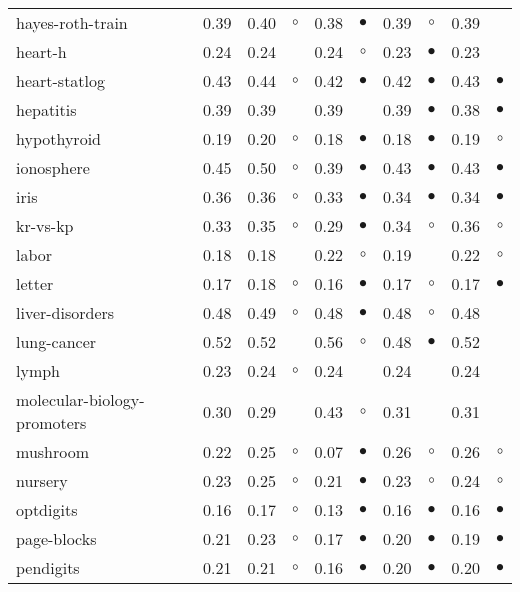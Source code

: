 \begin{table}[thb]
{\begin{tabular}{lrr@{\hspace{0.1cm}}cr@{\hspace{0.1cm}}cr@{\hspace{0.1cm}}cr@{\hspace{0.1cm}}c}
hayes-roth-train & 0.39 & 0.40 &   $\circ$ & 0.38 & $\bullet$ & 0.39 &   $\circ$ & 0.39 &           \\
heart-h & 0.24 & 0.24 &           & 0.24 &   $\circ$ & 0.23 & $\bullet$ & 0.23 &           \\
heart-statlog & 0.43 & 0.44 &   $\circ$ & 0.42 & $\bullet$ & 0.42 & $\bullet$ & 0.43 &  $\bullet$\\
hepatitis & 0.39 & 0.39 &           & 0.39 &           & 0.39 & $\bullet$ & 0.38 &  $\bullet$\\
hypothyroid & 0.19 & 0.20 &   $\circ$ & 0.18 & $\bullet$ & 0.18 & $\bullet$ & 0.19 &    $\circ$\\
ionosphere & 0.45 & 0.50 &   $\circ$ & 0.39 & $\bullet$ & 0.43 & $\bullet$ & 0.43 &  $\bullet$\\
iris & 0.36 & 0.36 &   $\circ$ & 0.33 & $\bullet$ & 0.34 & $\bullet$ & 0.34 &  $\bullet$\\
kr-vs-kp & 0.33 & 0.35 &   $\circ$ & 0.29 & $\bullet$ & 0.34 &   $\circ$ & 0.36 &    $\circ$\\
labor & 0.18 & 0.18 &           & 0.22 &   $\circ$ & 0.19 &           & 0.22 &    $\circ$\\
letter & 0.17 & 0.18 &   $\circ$ & 0.16 & $\bullet$ & 0.17 &   $\circ$ & 0.17 &  $\bullet$\\
liver-disorders & 0.48 & 0.49 &   $\circ$ & 0.48 & $\bullet$ & 0.48 &   $\circ$ & 0.48 &           \\
lung-cancer & 0.52 & 0.52 &           & 0.56 &   $\circ$ & 0.48 & $\bullet$ & 0.52 &           \\
lymph & 0.23 & 0.24 &   $\circ$ & 0.24 &           & 0.24 &           & 0.24 &           \\
molecular-biology-promoters & 0.30 & 0.29 &           & 0.43 &   $\circ$ & 0.31 &           & 0.31 &           \\
mushroom & 0.22 & 0.25 &   $\circ$ & 0.07 & $\bullet$ & 0.26 &   $\circ$ & 0.26 &    $\circ$\\
nursery & 0.23 & 0.25 &   $\circ$ & 0.21 & $\bullet$ & 0.23 &   $\circ$ & 0.24 &    $\circ$\\
optdigits & 0.16 & 0.17 &   $\circ$ & 0.13 & $\bullet$ & 0.16 & $\bullet$ & 0.16 &  $\bullet$\\
page-blocks & 0.21 & 0.23 &   $\circ$ & 0.17 & $\bullet$ & 0.20 & $\bullet$ & 0.19 &  $\bullet$\\
pendigits & 0.21 & 0.21 &   $\circ$ & 0.16 & $\bullet$ & 0.20 & $\bullet$ & 0.20 &  $\bullet$\\

\end{tabular}}
\end{table}
